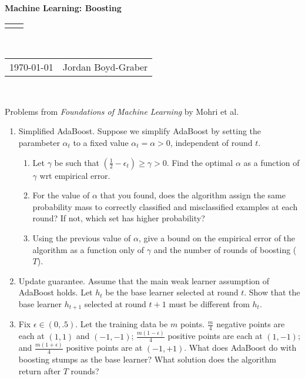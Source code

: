 \documentclass[12pt]{article}
\renewcommand{\title}[1]{\textbf{#1}\\}
\renewcommand{\line}{\begin{tabularx}{\textwidth}{X>{\raggedleft}X}\hline\\\end{tabularx}\\[-0.5cm]}
\newcommand{\leftright}[2]{\begin{tabularx}{\textwidth}{X>{\raggedleft}X}#1%
& #2\\\end{tabularx}\\[-0.5cm]}
\begin{document}
\title{Machine Learning: Boosting}
\line
\leftright{\today}{Jordan Boyd-Graber} %

\begin{center}
  Problems from \emph{Foundations of Machine Learning} by Mohri et al.
\end{center}

\begin{enumerate}
  \item Simplified AdaBoost.  Suppose we simplify AdaBoost by setting
    the parambeter $\alpha_t$ to a fixed value $\alpha_t = \alpha> 0$,
    independent of round $t$.
    \begin{enumerate}
      \item Let $\gamma$ be such that $\left(\frac{1}{2} - \epsilon_t \right)
        \geq \gamma > 0$.  Find the optimal $\alpha$ as a function of $\gamma$
        wrt empirical error.

     \item For the value of $\alpha$ that you found, does the algorithm assign
       the same probability mass to correctly classified and misclassified
       examples at each round?  If not, which set has higher probability?

     \item Using the previous value of $\alpha$, give a bound on the empirical
       error of the algorithm as a function only of $\gamma$ and the number of
       rounds of boosting ($T$).
    \end{enumerate}

    \item Update guarantee.  Assume that the main weak learner assumption of
      AdaBoost holds.  Let $h_t$ be the base learner selected at round $t$.  Show
      that the base learner $h_{t+1}$ selected at round $t+1$ must be different
      from $h_t$.

    \item Fix $\epsilon \in (0, .5)$.  Let the training data be $m$
      points.  $\frac{m}{4}$ negative points are each at $(1,1)$ and
      $(-1, -1)$; $\frac{m (1 - \epsilon)}{4}$ positive points are each at $(1,
      -1)$; and $\frac{m (1 + \epsilon)}{4}$ positive points are at $(-1, +1)$.
      What does AdaBoost do with boosting stumps as the base learner?
      What solution does the algorithm return after $T$ rounds?

\end{enumerate}
\end{document}

